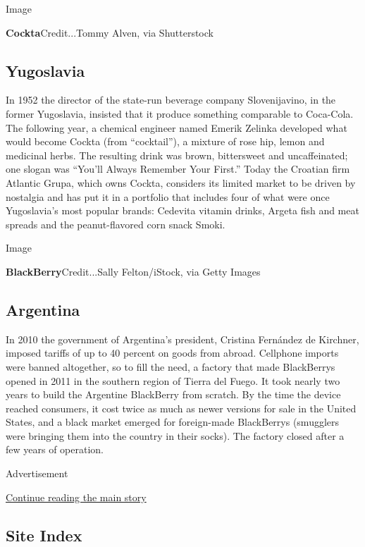 Image

\textbf{Cockta}Credit...Tommy Alven, via Shutterstock

\hypertarget{yugoslavia}{%
\subsection{\texorpdfstring{\textbf{Yugoslavia}}{Yugoslavia}}\label{yugoslavia}}

In 1952 the director of the state-run beverage company Slovenijavino, in
the former Yugoslavia, insisted that it produce something comparable to
Coca-Cola. The following year, a chemical engineer named Emerik Zelinka
developed what would become Cockta (from ``cocktail''), a mixture of
rose hip, lemon and medicinal herbs. The resulting drink was brown,
bittersweet and uncaffeinated; one slogan was ``You'll Always Remember
Your First.'' Today the Croatian firm Atlantic Grupa, which owns Cockta,
considers its limited market to be driven by nostalgia and has put it in
a portfolio that includes four of what were once Yugoslavia's most
popular brands: Cedevita vitamin drinks, Argeta fish and meat spreads
and the peanut-flavored corn snack Smoki.

Image

\textbf{BlackBerry}Credit...Sally Felton/iStock, via Getty Images

\hypertarget{argentina}{%
\subsection{\texorpdfstring{\textbf{Argentina}}{Argentina}}\label{argentina}}

In 2010 the government of Argentina's president, Cristina Fernández de
Kirchner, imposed tariffs of up to 40 percent on goods from abroad.
Cellphone imports were banned altogether, so to fill the need, a factory
that made BlackBerrys opened in 2011 in the southern region of Tierra
del Fuego. It took nearly two years to build the Argentine BlackBerry
from scratch. By the time the device reached consumers, it cost twice as
much as newer versions for sale in the United States, and a black market
emerged for foreign-made BlackBerrys (smugglers were bringing them into
the country in their socks). The factory closed after a few years of
operation.

Advertisement

\protect\hyperlink{after-bottom}{Continue reading the main story}

\hypertarget{site-index}{%
\subsection{Site Index}\label{site-index}}

